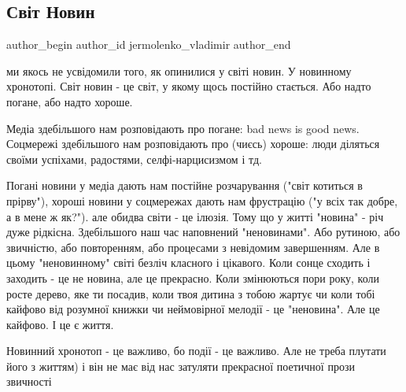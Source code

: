  
 
 
 
 
 
\subsection{Світ Новин}
\label{sec:29_09_2021.fb.jermolenko_vladimir.1.svit_novyn}
 
\ifcmt
 author_begin
   author_id jermolenko_vladimir
 author_end
\fi

ми якось не усвідомили того, як опинилися у світі новин. У новинному хронотопі.
Світ новин - це світ, у якому щось постійно стається. Або надто погане, або
надто хороше. 

Медіа здебільшого нам розповідають про погане: bad news is good news. Соцмережі
здебільшого нам розповідають про (чиєсь) хороше: люди діляться своїми успіхами,
радостями, селфі-нарцисизмом і тд. 

Погані новини у медіа дають нам постійне розчарування ("світ котиться в
прірву"), хороші новини у соцмережах дають нам фрустрацію ("у всіх так добре, а
в мене ж як?").  але обидва світи - це ілюзія. Тому що у житті "новина" - річ
дуже рідкісна.  Здебільшого наш час наповнений "неновинами". Або рутиною, або
звичністю, або повторенням, або процесами з невідомим завершенням. Але в цьому
"неновинному" світі безліч класного і цікавого. Коли сонце сходить і заходить -
це не новина, але це прекрасно. Коли змінюються пори року, коли росте дерево,
яке ти посадив, коли твоя дитина з тобою жартує чи коли тобі кайфово від
розумної книжки чи неймовірної мелодії - це "неновина". Але це кайфово. І це є
життя.  

Новинний хронотоп - це важливо, бо події - це важливо. Але не треба плутати
його з життям) і він не має від нас затуляти прекрасної поетичної прози
звичності

